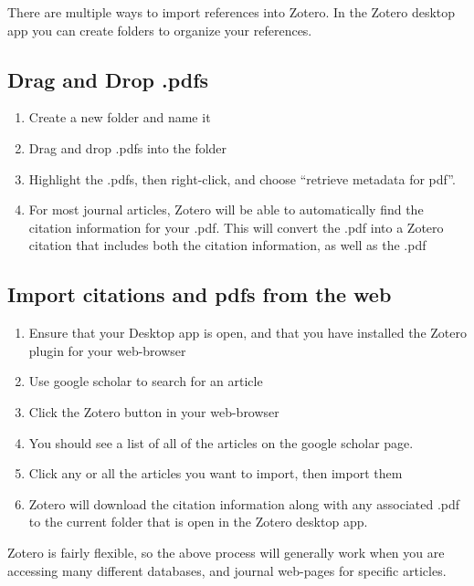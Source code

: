 \documentclass[]{book}
\providecommand{\tightlist}{%
  \setlength{\itemsep}{0pt}\setlength{\parskip}{0pt}}
\theoremstyle{definition}
\theoremstyle{definition}
\theoremstyle{definition}
\theoremstyle{remark}
\begin{document}
There are multiple ways to import references into Zotero. In the Zotero
desktop app you can create folders to organize your references.

\subsection{Drag and Drop .pdfs}\label{drag-and-drop-.pdfs}

\begin{enumerate}
\def\labelenumi{\arabic{enumi}.}
\tightlist
\item
  Create a new folder and name it
\item
  Drag and drop .pdfs into the folder
\item
  Highlight the .pdfs, then right-click, and choose ``retrieve metadata
  for pdf''.
\item
  For most journal articles, Zotero will be able to automatically find
  the citation information for your .pdf. This will convert the .pdf
  into a Zotero citation that includes both the citation information, as
  well as the .pdf
\end{enumerate}

\subsection{Import citations and pdfs from the
web}\label{import-citations-and-pdfs-from-the-web}

\begin{enumerate}
\def\labelenumi{\arabic{enumi}.}
\tightlist
\item
  Ensure that your Desktop app is open, and that you have installed the
  Zotero plugin for your web-browser
\item
  Use google scholar to search for an article
\item
  Click the Zotero button in your web-browser
\item
  You should see a list of all of the articles on the google scholar
  page.
\item
  Click any or all the articles you want to import, then import them
\item
  Zotero will download the citation information along with any
  associated .pdf to the current folder that is open in the Zotero
  desktop app.
\end{enumerate}

Zotero is fairly flexible, so the above process will generally work when
you are accessing many different databases, and journal web-pages for
specific articles.
\end{document}
